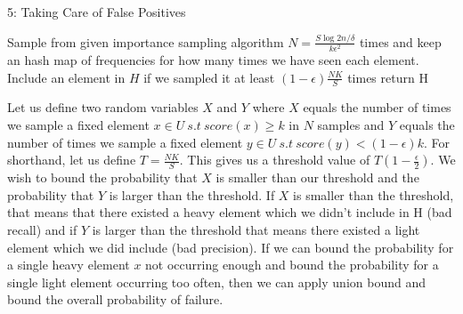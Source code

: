 \documentclass[12pt]{article}
\begin{document}
\begin{problem}{5: Taking Care of False Positives}
\end{problem}

\begin{solution}

\begin{answerbox}
\begin{algorithmic}[1]
\State Sample from given importance sampling algorithm $N = \frac{S\log{2n/\delta}}{k\epsilon^2}$ times and keep an hash map of frequencies for how many times we have seen each element. 
\State Include an element in $H$ if we sampled it at least $(1-\epsilon)\frac{NK}{S}$ times
\State return H
\EndProcedure
\end{algorithmic}
\end{answerbox}
Let us define two random variables $X$ and $Y$ where $X$ equals the number of times we sample a fixed element $x \in U~ s.t~ score(x) \geq k$ in $N$ samples and $Y$ equals the number of times we sample a fixed element $y \in U~ s.t ~score(y) < (1-\epsilon)k$. For shorthand, let us define $T = \frac{NK}{S}$. This gives us a threshold value of $T(1-\frac{\epsilon}{2})$. We wish to bound the probability that $X$ is smaller than our threshold and the probability that $Y$ is larger than the threshold. If $X$ is smaller than the threshold, that means that there existed a heavy element which we didn't include in H (bad recall) and if $Y$ is larger than the threshold that means there existed a light element which we did include (bad precision). If we can bound the probability for a single heavy element $x$ not occurring enough and bound the probability for a single light element occurring too often, then we can apply union bound and bound the overall probability of failure. \\


\end{solution}
\end{document}
